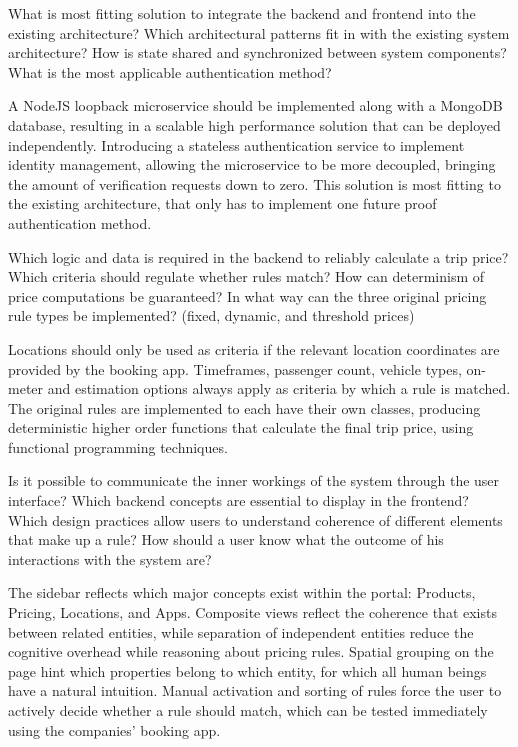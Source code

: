 What is most fitting solution to integrate the backend and frontend into the existing architecture?
Which architectural patterns fit in with the existing system architecture?
How is state shared and synchronized between system components?
What is the most applicable authentication method?

A NodeJS loopback microservice should be implemented along with a MongoDB database, resulting in a scalable high performance solution that can be deployed independently. Introducing a stateless authentication service to implement identity management, allowing the microservice to be more decoupled, bringing the amount of verification requests down to zero. This solution is most fitting to the existing architecture, that only has to implement one future proof authentication method.

Which logic and data is required in the backend to reliably calculate a trip price?
Which criteria should regulate whether rules match?
How can determinism of price computations be guaranteed?
In what way can the three original pricing rule types be implemented? (fixed, dynamic, and threshold prices)

Locations should only be used as criteria if the relevant location coordinates are provided by the booking app. Timeframes, passenger count, vehicle types, on-meter and estimation options always apply as criteria by which a rule is matched. The original rules are implemented to each have their own classes, producing deterministic higher order functions that calculate the final trip price, using functional programming techniques.


Is it possible to communicate the inner workings of the system through the user interface?
Which backend concepts are essential to display in the frontend?
Which design practices allow users to understand coherence of different elements that make up a rule?
How should a user know what the outcome of his interactions with the system are?

The sidebar reflects which major concepts exist within the portal: Products, Pricing, Locations, and Apps. Composite views reflect the coherence that exists between related entities, while separation of independent entities reduce the cognitive overhead while reasoning about pricing rules. Spatial grouping on the page hint which properties belong to which entity, for which all human beings have a natural intuition. Manual activation and sorting of rules force the user to actively decide whether a rule should match, which can be tested immediately using the companies' booking app.


